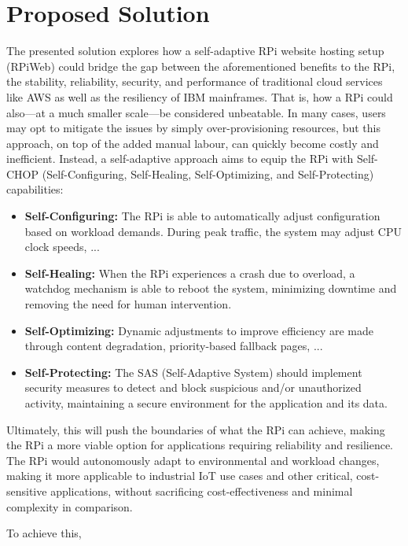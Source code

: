 \documentclass[conference]{IEEEtran}
\begin{document}
\section{\textbf{Proposed Solution}}\label{proposed_solution}
The presented solution explores how a self-adaptive RPi website hosting setup (RPiWeb) could bridge the gap between the aforementioned benefits to the RPi, the stability, reliability, security, and performance of traditional cloud services like AWS as well as the resiliency of IBM mainframes. That is, how a RPi could also—at a much smaller scale—be considered unbeatable. In many cases, users may opt to mitigate the issues by simply over-provisioning resources, but this approach, on top of the added manual labour, can quickly become costly and inefficient. Instead, a self-adaptive approach aims to equip the RPi with Self-CHOP (Self-Configuring, Self-Healing, Self-Optimizing, and Self-Protecting) capabilities:

\begin{itemize}
    \item \textbf{Self-Configuring:} The RPi is able to automatically adjust configuration based on workload demands. During peak traffic, the system may adjust CPU clock speeds, ...
    \item \textbf{Self-Healing:} When the RPi experiences a crash due to overload, a watchdog mechanism is able to reboot the system, minimizing downtime and removing the need for human intervention.
    \item \textbf{Self-Optimizing:} Dynamic adjustments to improve efficiency are made through content degradation, priority-based fallback pages, ...
    \item \textbf{Self-Protecting:} The SAS (Self-Adaptive System) should implement security measures to detect and block suspicious and/or unauthorized activity, maintaining a secure environment for the application and its data.
\end{itemize}

Ultimately, this will push the boundaries of what the RPi can achieve, making the RPi a more viable option for applications requiring reliability and resilience. The RPi would autonomously adapt to environmental and workload changes, making it more applicable to industrial IoT use cases and other critical, cost-sensitive applications, without sacrificing cost-effectiveness and minimal complexity in comparison.

To achieve this, 
\end{document}
